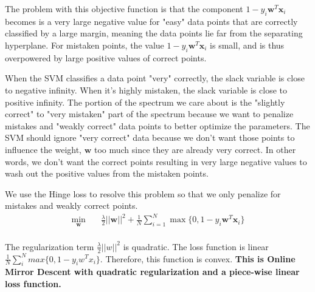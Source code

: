 \documentclass[11pt]{article}
\begin{document}
The problem with this objective function is that the component $1 - y_i \mathbf{w}^T \mathbf{x}_i$ becomes is a very large negative value for "easy" data points that are correctly classified by a large margin, meaning the data points lie far from the separating hyperplane. For mistaken points, the value $1 - y_i \mathbf{w}^T \mathbf{x}_i$ is small, and is thus overpowered by large positive values of correct points.



When the SVM classifies a data point "very" correctly, the slack variable is close to negative infinity. When it's highly mistaken, the slack variable is close to positive infinity. 
The portion of the spectrum we care about is the "slightly correct" to "very mistaken" part of the spectrum because we want to penalize mistakes and "weakly correct" data points to better optimize the parameters. The SVM should ignore "very correct" data because we don't want those points to influence the weight, $\mathbf{w}$ too much since they are already very correct. In other words, we don't want the correct points resulting in very large negative values to wash out the positive values from the mistaken points.

We use the Hinge loss to resolve this problem so that we only penalize for mistakes and weakly correct points.
\begin{equation}
\begin{aligned}
\min_{\mathbf{w}} \quad & \frac{\lambda}{2}||\mathbf{w}||^2 + \frac{1}{N}\sum_{i=1}^N \max\{0, 1 - y_i \mathbf{w}^T \mathbf{x}_i\} \\
\end{aligned}
\end{equation}


The regularization term $\frac{\lambda}{2}||w||^2$ is quadratic. The loss function is linear $ \frac{1}{N}\sum_{i}^N max\{0,1-y_i w^T x_i\}$. Therefore, this function is convex. \textbf{This is Online Mirror Descent with quadratic regularization and a piece-wise linear loss function.}
\end{document}
